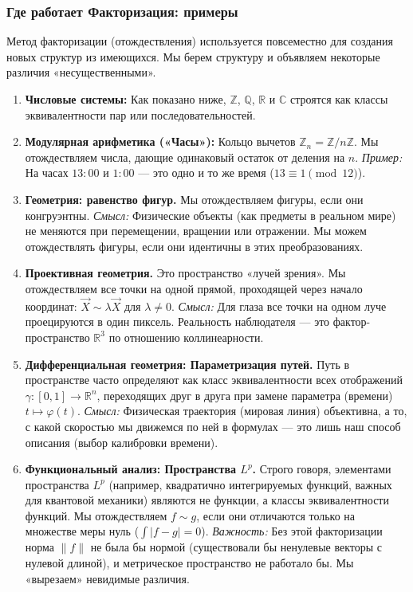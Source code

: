 \documentclass[11pt, a4paper]{extarticle}
\newcommand{\Z}{{\mathbb Z}}
\newcommand{\R}{{\mathbb R}}
\newcommand{\C}{{\mathbb C}}
\newcommand{\Q}{{\mathbb Q}}
\begin{document}
\subsubsection{Где работает Факторизация: примеры}

Метод факторизации (отождествления) используется повсеместно для создания новых структур из имеющихся. Мы берем структуру и объявляем некоторые различия «несущественными».

\begin{enumerate}
    \item \textbf{Числовые системы:} Как показано ниже, $\Z$, $\Q$, $\R$ и $\C$ строятся как классы эквивалентности пар или последовательностей.
    
    \item \textbf{Модулярная арифметика («Часы»):} 
    Кольцо вычетов $\Z_n = \Z / n\Z$. Мы отождествляем числа, дающие одинаковый остаток от деления на $n$. 
    \textit{Пример:} На часах $13:00$ и $1:00$ — это одно и то же время ($13 \equiv 1 \pmod{12}$).
    
    \item \textbf{Геометрия: равенство фигур.}
    Мы отождествляем фигуры, если они конгруэнтны.
    \textit{Смысл:} Физические объекты (как предметы в реальном мире) не меняются при перемещении, вращении или отражении. Мы можем отождествлять фигуры, если они идентичны в этих преобразованиях.
    
    \item \textbf{Проективная геометрия.}
    Это пространство «лучей зрения». Мы отождествляем все точки на одной прямой, проходящей через начало координат: $\vec X \sim \lambda \vec X$ для $\lambda \neq 0$.
    \textit{Смысл:} Для глаза все точки на одном луче проецируются в один пиксель. Реальность наблюдателя — это фактор-пространство $\R^3$ по отношению коллинеарности.

    \item \textbf{Дифференциальная геометрия: Параметризация путей.}
    Путь в пространстве часто определяют как класс эквивалентности всех отображений $\gamma: [0,1] \to \R^n$, переходящих друг в друга при замене параметра (времени) $t \mapsto \varphi(t)$.
    \textit{Смысл:} Физическая траектория (мировая линия) объективна, а то, с какой скоростью мы движемся по ней в формулах — это лишь наш способ описания (выбор калибровки времени).

    \item \textbf{Функциональный анализ: Пространства $L^p$.}
    Строго говоря, элементами пространства $L^p$ (например, квадратично интегрируемых функций, важных для квантовой механики) являются не функции, а классы эквивалентности функций.
    Мы отождествляем $f \sim g$, если они отличаются только на множестве меры нуль ($\int |f-g| = 0$).
    \textit{Важность:} Без этой факторизации норма $\|f\|$ не была бы нормой (существовали бы ненулевые векторы с нулевой длиной), и метрическое пространство не работало бы. Мы «вырезаем» невидимые различия.
    

\end{enumerate}
\end{document}
